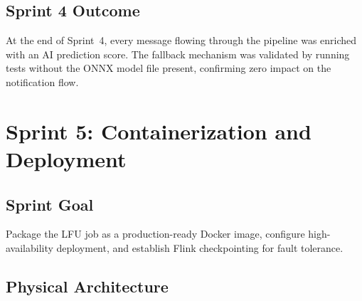 \subsection{Sprint 4 Outcome}

At the end of Sprint~4, every message flowing through the pipeline was enriched with an AI prediction score. The fallback mechanism was validated by running tests without the ONNX model file present, confirming zero impact on the notification flow.

\section{Sprint 5: Containerization and Deployment}
\label{sec:sprint5}

\subsection{Sprint Goal}

Package the LFU job as a production-ready Docker image, configure high-availability deployment, and establish Flink checkpointing for fault tolerance.

\subsection{Physical Architecture}

